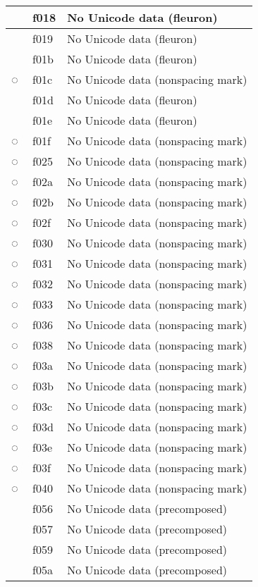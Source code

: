 \documentclass[12pt,letterpaper,openany]{book}
\begin{document}
\begin{center}
\begin{supertabular}{|m{0.25in}|m{0.5in}|m{4in}|}
			 & f018 & No Unicode data (fleuron)\\\hline
			 & f019 & No Unicode data (fleuron)\\\hline
			 & f01b & No Unicode data (fleuron)\\\hline
			◌ & f01c & No Unicode data (nonspacing mark)\\\hline
			 & f01d & No Unicode data (fleuron)\\\hline
			 & f01e & No Unicode data (fleuron)\\\hline
			◌ & f01f & No Unicode data (nonspacing mark)\\\hline
			◌ & f025 & No Unicode data (nonspacing mark)\\\hline
			◌ & f02a & No Unicode data (nonspacing mark)\\\hline
			◌ & f02b & No Unicode data (nonspacing mark)\\\hline
			◌ & f02f & No Unicode data (nonspacing mark)\\\hline
			◌ & f030 & No Unicode data (nonspacing mark)\\\hline
			◌ & f031 & No Unicode data (nonspacing mark)\\\hline
			◌ & f032 & No Unicode data (nonspacing mark)\\\hline
			◌ & f033 & No Unicode data (nonspacing mark)\\\hline
			◌ & f036 & No Unicode data (nonspacing mark)\\\hline
			◌ & f038 & No Unicode data (nonspacing mark)\\\hline
			◌ & f03a & No Unicode data (nonspacing mark)\\\hline
			◌ & f03b & No Unicode data (nonspacing mark)\\\hline
			◌ & f03c & No Unicode data (nonspacing mark)\\\hline
			◌ & f03d & No Unicode data (nonspacing mark)\\\hline
			◌ & f03e & No Unicode data (nonspacing mark)\\\hline
			◌ & f03f & No Unicode data (nonspacing mark)\\\hline
			◌ & f040 & No Unicode data (nonspacing mark)\\\hline
			 & f056 & No Unicode data (precomposed)\\\hline
			 & f057 & No Unicode data (precomposed)\\\hline
			 & f059 & No Unicode data (precomposed)\\\hline
			 & f05a & No Unicode data (precomposed)\\\hline

\end{supertabular}
\end{center}
\end{document}
